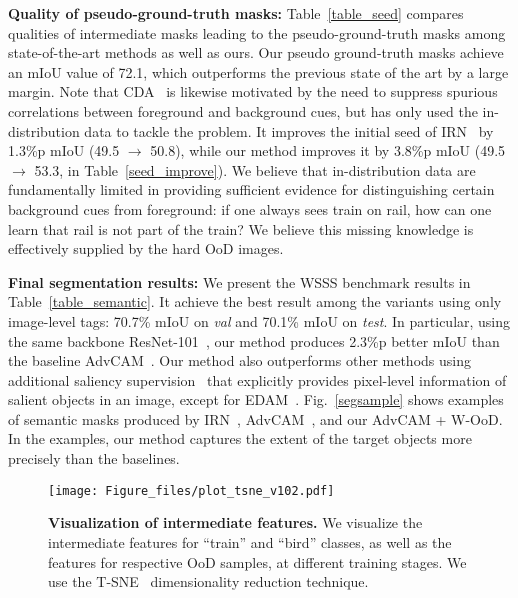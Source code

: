 \documentclass[10pt,twocolumn,letterpaper]{article}
\begin{document}
\textbf{Quality of pseudo-ground-truth masks:}
Table~\ref{table_seed} compares qualities of intermediate masks leading to the pseudo-ground-truth masks among state-of-the-art methods as well as ours.
Our pseudo ground-truth masks achieve an mIoU value of 72.1, which outperforms the previous state of the art by a large margin.
Note that CDA~\cite{su2021context} is likewise motivated by the need to suppress spurious correlations between foreground and background cues, but has only used the in-distribution data to tackle the problem.
It improves the initial seed of IRN~\cite{ahn2019weakly} by 1.3\%p mIoU (49.5 $\rightarrow$ 50.8), while our method improves it by 3.8\%p mIoU (49.5 $\rightarrow$ 53.3, in Table~\ref{seed_improve}).
We believe that in-distribution data are fundamentally limited in providing sufficient evidence for distinguishing certain background cues from foreground: if one always sees train on rail, how can one learn that rail is not part of the train?
We believe this missing knowledge is effectively supplied by the hard OoD images.














\textbf{Final segmentation results:}
We present the WSSS benchmark results in Table~\ref{table_semantic}.
It achieve the best result among the variants using only image-level tags: 70.7\% mIoU on \emph{val} and 70.1\% mIoU on \emph{test}. 
In particular, using the same backbone ResNet-101~\cite{he2016deep}, our method produces 2.3\%p better mIoU than the baseline AdvCAM~\cite{lee2021anti}.
Our method also outperforms other methods using additional saliency supervision~\cite{li2014secrets, liu2010learning} that explicitly provides pixel-level information of salient objects in an image, except for EDAM~\cite{wu2021embedded}.
Fig.~\ref{segsample} shows examples of semantic masks produced by IRN~\cite{ahn2019weakly}, AdvCAM~\cite{lee2021anti}, and our AdvCAM + W-OoD.
In the examples, our method captures the extent of the target objects more precisely than the baselines.







\begin{figure*}[t]
\centering
\texttt{[image: Figure\_files/plot\_tsne\_v102.pdf]}
\vspace{-1.7em}
\caption{\label{tsne_samples} \textbf{Visualization of intermediate features.} We visualize the intermediate features for ``train'' and ``bird'' classes, as well as the features for respective OoD samples, at different training stages. We use the T-SNE~\cite{maaten2008visualizing} dimensionality reduction technique.}
\vspace{-0.7em}
\end{figure*}
 
\end{document}
